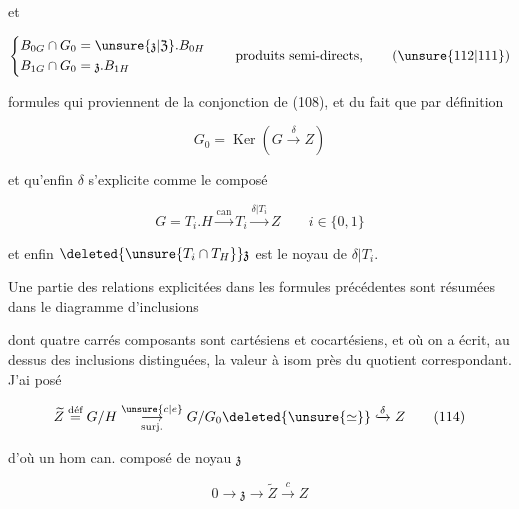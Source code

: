
et

\[\left\{\begin{aligned}
B_{0G}\cap G_0&=\unsure{\mathfrak{z}|\mathfrak{Z}}.B_{0H}\\
B_{1G}\cap G_0&=\mathfrak{z}.B_{1H}
\end{aligned}\right.\qquad\text{produits semi-directs},\tag*{(\unsure{112|111})}\]

formules qui proviennent de la conjonction de (108), et du fait que par définition

\[G_0=\operatorname{Ker}(G\xrightarrow{\delta}Z)\]

et qu'enfin $\delta$ s'explicite comme le composé

\[G=T_i.H\xrightarrow{\mathrm{can}}T_i\xrightarrow{\delta|T_i}Z\qquad i\in\{0,1\}\]

et  enfin $\deleted{\unsure{T_i\cap T_H}}\mathfrak{z}$ est le noyau de $\delta|T_i$.

Une partie des relations explicitées dans les formules précédentes sont résumées dans le diagramme d'inclusions


dont  quatre carrés composants sont cartésiens et cocartésiens, et où on a écrit, au dessus des inclusions distinguées, la valeur à isom près du quotient correspondant. J'ai posé

\[\widetilde Z\overset{\text{déf}}{=}G/H\underset{\mathrm{surj}.}{\overset{\unsure{c|e}}{\longrightarrow}}G/G_0\deleted{\unsure{\simeq}}\lhook\joinrel\xrightarrow{\delta} Z\tag*{(114)}\]


d'où un hom can. composé  de noyau $\mathfrak{z}$

\[0\longrightarrow\mathfrak{z}\longrightarrow\widetilde Z\xrightarrow{c}Z\tag*{(115)}\]

